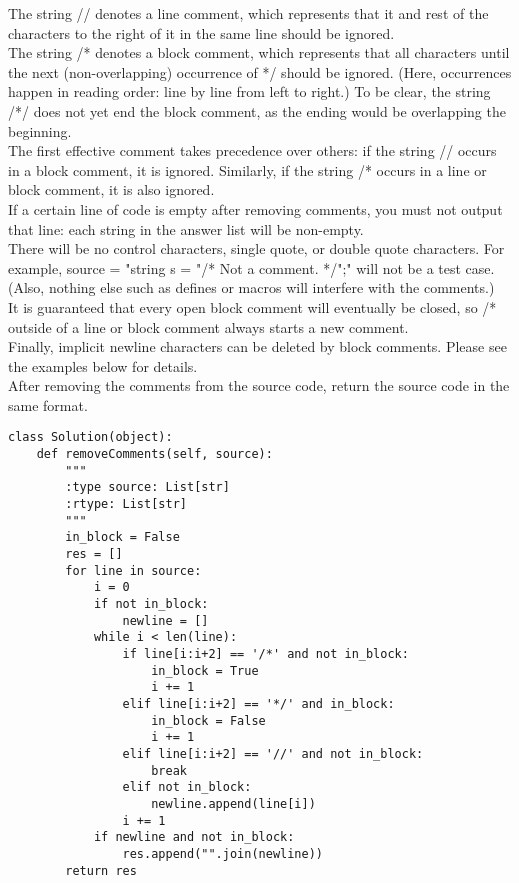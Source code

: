 The string // denotes a line comment, which represents that it and rest of the characters to the right of it in the same line should be ignored.\\

The string /* denotes a block comment, which represents that all characters until the next (non-overlapping) occurrence of */ should be ignored. (Here, occurrences happen in reading order: line by line from left to right.) To be clear, the string /*/ does not yet end the block comment, as the ending would be overlapping the beginning.\\

The first effective comment takes precedence over others: if the string // occurs in a block comment, it is ignored. Similarly, if the string /* occurs in a line or block comment, it is also ignored.\\

If a certain line of code is empty after removing comments, you must not output that line: each string in the answer list will be non-empty.\\

There will be no control characters, single quote, or double quote characters. For example, source = "string s = "/* Not a comment. */";" will not be a test case. (Also, nothing else such as defines or macros will interfere with the comments.)\\

It is guaranteed that every open block comment will eventually be closed, so /* outside of a line or block comment always starts a new comment.\\

Finally, implicit newline characters can be deleted by block comments. Please see the examples below for details.\\

After removing the comments from the source code, return the source code in the same format.\\

\begin{lstlisting}
class Solution(object):
    def removeComments(self, source):
        """
        :type source: List[str]
        :rtype: List[str]
        """
        in_block = False
        res = []
        for line in source:
            i = 0
            if not in_block:
                newline = []
            while i < len(line):
                if line[i:i+2] == '/*' and not in_block:
                    in_block = True
                    i += 1
                elif line[i:i+2] == '*/' and in_block:
                    in_block = False
                    i += 1
                elif line[i:i+2] == '//' and not in_block:
                    break
                elif not in_block:
                    newline.append(line[i])
                i += 1
            if newline and not in_block:
                res.append("".join(newline))
        return res
\end{lstlisting}

